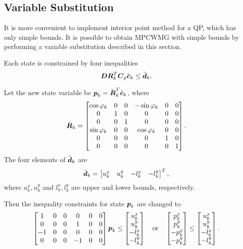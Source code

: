 \subsection{Variable Substitution}\label{sec.ip_incon}
It is more convenient to implement interior point method for a \ac{QP}, which
has only simple bounds. It is possible to obtain \ac{MPCWMG} with simple bounds 
by performing a variable substitution described in this section.

Each state is constrained by four inequalities
$$
\mbox{\boldmath $D$}\mbox{\boldmath $R$}^T_k \mbox{\boldmath $C$}_p \tilde{\mbox{\boldmath $c$}}_k \leq \tilde{\mbox{\boldmath $d$}}_{k}.
$$

Let the new state variable be $\mbox{\boldmath $p$}_k = \bar{\mbox{\boldmath $R$}}^T_k \tilde{\mbox{\boldmath $c$}}_k$,
where
$$
\bar{\mbox{\boldmath $R$}}_k 
=
  \begin{bmatrix} 
    \cos\varphi_k   & 0     & 0 &  -\sin\varphi_k & 0 & 0\\
    0               & 1     & 0 &   0             & 0 & 0\\
    0               & 0     & 1 &   0             & 0 & 0\\
    \sin\varphi_k   & 0     & 0 &   \cos\varphi_k & 0 & 0\\
    0               & 0     & 0 &   0             & 1 & 0\\
    0               & 0     & 0 &   0             & 0 & 1
  \end{bmatrix}.
$$
The four elements of $\tilde{\mbox{\boldmath $d$}}_{k}$ are
$$
\tilde{\mbox{\boldmath $d$}}_{k} =
  \begin{bmatrix} 
    u_k^x & u_k^y & -l_k^x & -l_k^y
  \end{bmatrix}^T,
$$
where $u_k^x, u_k^y$ and $l_k^x, l_k^y$ are upper and lower bounds, respectively.

Then the inequality constraints for state $\mbox{\boldmath $p$}_k$ are changed to
$$
  \begin{bmatrix} 
     1 & 0 & 0 &  0 & 0 & 0\\
     0 & 0 & 0 &  1 & 0 & 0\\
    -1 & 0 & 0 &  0 & 0 & 0\\
     0 & 0 & 0 & -1 & 0 & 0
  \end{bmatrix}
 \mbox{\boldmath $p$}_k 
\leq
  \begin{bmatrix} 
    u_k^x\\
    u_k^y\\
    -l_k^x\\
    -l_k^y
  \end{bmatrix}
\quad
\mbox{or}
\quad
  \begin{bmatrix} 
     p_k^x\\
     p_k^y\\
    -p_k^x\\
    -p_k^y
  \end{bmatrix}
\leq
  \begin{bmatrix} 
    u_k^x\\
    u_k^y\\
    -l_k^x\\
    -l_k^y
  \end{bmatrix}.
$$

